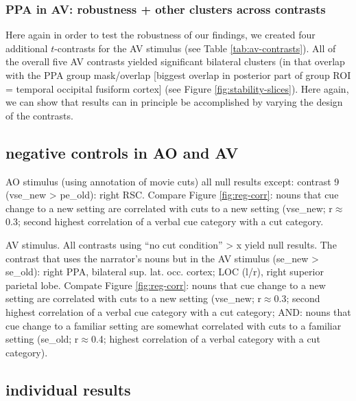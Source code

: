 \documentclass[english]{article}
\begin{document}
\subsubsection{PPA in AV: robustness + other clusters across contrasts}

Here again in order to test the robustness of our findings, we created four
additional $t$-contrasts for the AV stimulus (see Table \ref{tab:av-contrasts}).
All of the overall five AV contrasts yielded significant bilateral clusters (in
that overlap with the PPA group mask/overlap [biggest overlap in posterior part
of group ROI = temporal occipital fusiform cortex] (see Figure
\ref{fig:stability-slices}).
Here again, we can show that results can in principle be accomplished by varying
the design of the contrasts.


\subsection{negative controls in AO and AV}


AO stimulus (using annotation of movie cuts) all null results except: contrast 9
(vse\_new > pe\_old): right RSC.
Compare Figure \ref{fig:reg-corr}: nouns that cue change to a new setting are
correlated  with cuts to a new setting (vse\_new; r$\approx$0.3; second highest
correlation of a verbal cue category with a cut category.

AV stimulus. All contrasts using ``no cut condition'' > x yield null results.
The contrast that uses the narrator's nouns but in the AV stimulus (se\_new >
se\_old): right PPA, bilateral sup. lat. occ. cortex; LOC (l/r), right superior
parietal lobe. Compate Figure \ref{fig:reg-corr}: nouns that cue change to a new
setting are correlated  with cuts to a new setting (vse\_new; r$\approx$0.3;
second highest correlation of a verbal cue category with a cut category; AND:
nouns that cue change to a familiar setting are somewhat correlated with cuts to
a familiar setting (se\_old; r$\approx$0.4; highest correlation of a verbal
category with a cut category).


\subsection{individual results}
\end{document}
